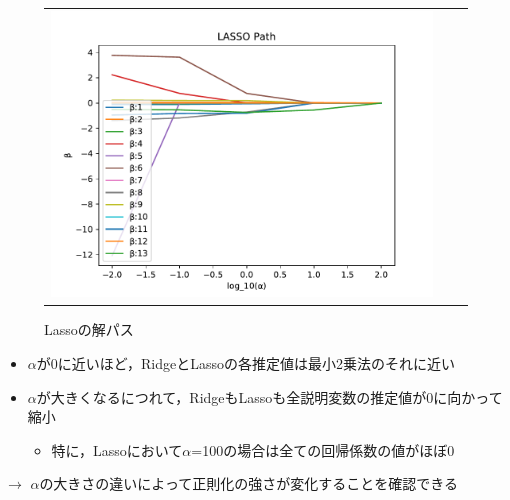 \documentclass[dvipdfmx, 10pt]{beamer}
\begin{document}
\begin{frame}{\insertsubsection}
\begin{figure}[H]
\begin{tabular}{ccc}
\begin{minipage}{0.33\hsize}
            		 \caption{Ridgeの解パス}
            		 \label{fig:ridge}
            	 \end{minipage}
            	 \begin{minipage}{0.33\hsize}
                   	 \includegraphics[width=1.0\linewidth]{../img/lassoPath.pdf}
            		 \caption{Lassoの解パス}
            		 \label{fig:lasso}
            	 \end{minipage}
    	     \end{tabular}
    \end{figure}
    \begin{itemize}
        \item $\alpha$が0に近いほど，RidgeとLassoの各推定値は最小2乗法のそれに近い
        \item $\alpha$が大きくなるにつれて，RidgeもLassoも全説明変数の推定値が0に向かって縮小
         \begin{itemize}
            \item 特に，Lassoにおいて$\alpha$=100の場合は全ての回帰係数の値がほぼ0
         \end{itemize}
    \end{itemize}
    $\rightarrow$ $\alpha$の大きさの違いによって正則化の強さが変化することを確認できる
\end{frame}
\end{document}
